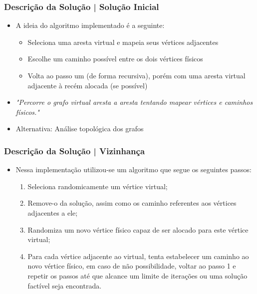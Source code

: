 \documentclass{beamer}
\begin{document}
\begin{frame}
\frametitle{Descrição da Solução | Solução Inicial}
\begin{itemize}
\item A ideia do algoritmo implementado é a seguinte:
	\begin{itemize}
	\item Seleciona uma aresta virtual e mapeia seus vértices adjacentes
	\item Escolhe um caminho possível entre os dois vértices físicos
	\item Volta ao passo um (de forma recursiva), porém com uma aresta virtual adjacente à recém alocada (se possível)
	\end{itemize}
\item \textit{"Percorre o grafo virtual aresta a aresta tentando mapear vértices e caminhos físicos."}
\item Alternativa: Análise topológica dos grafos
\end{itemize}
\end{frame}

\begin{frame}
\frametitle{Descrição da Solução | Vizinhança}
\begin{itemize}
\item Nessa implementação utilizou-se um algoritmo que segue os seguintes passos:
\begin{enumerate}
\item Seleciona randomicamente um vértice virtual;
\item Remove-o da solução, assim como os caminho referentes aos vértices adjacentes a ele;
\item Randomiza um novo vértice físico capaz de ser alocado para este vértice virtual;
\item Para cada vértice adjacente ao virtual, tenta estabelecer um caminho ao novo vértice físico, em caso de não possibilidade, voltar ao passo 1 e repetir os passos até que alcance um limite de iterações ou uma solução factível seja encontrada.
\end{enumerate}
\end{itemize}
\end{frame}
\end{document}
